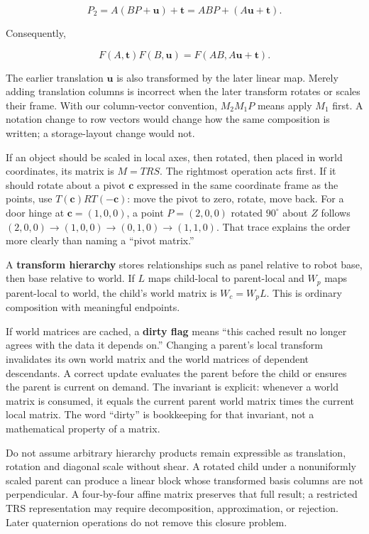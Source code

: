 \[
P_2=A(BP+\mathbf u)+\mathbf t
=ABP+(A\mathbf u+\mathbf t).
\]

Consequently,

\[
F(A,\mathbf t)F(B,\mathbf u)
=F(AB,A\mathbf u+\mathbf t).
\]

The earlier translation \(\mathbf u\) is also transformed by the later linear map. Merely adding translation columns is incorrect when the later transform rotates or scales their frame. With our column-vector convention, \(M_2M_1P\) means apply \(M_1\) first. A notation change to row vectors would change how the same composition is written; a storage-layout change would not.

If an object should be scaled in local axes, then rotated, then placed in world coordinates, its matrix is \(M=TRS\). The rightmost operation acts first. If it should rotate about a pivot \(\mathbf c\) expressed in the same coordinate frame as the points, use \(T(\mathbf c)RT(-\mathbf c)\): move the pivot to zero, rotate, move back. For a door hinge at \(\mathbf c=(1,0,0)\), a point \(P=(2,0,0)\) rotated \(90^\circ\) about \(Z\) follows \((2,0,0)\to(1,0,0)\to(0,1,0)\to(1,1,0)\). That trace explains the order more clearly than naming a ``pivot matrix.''

A \textbf{transform hierarchy} stores relationships such as panel relative to robot base, then base relative to world. If \(L\) maps child-local to parent-local and \(W_p\) maps parent-local to world, the child's world matrix is \(W_c=W_pL\). This is ordinary composition with meaningful endpoints.

If world matrices are cached, a \textbf{dirty flag} means ``this cached result no longer agrees with the data it depends on.'' Changing a parent's local transform invalidates its own world matrix and the world matrices of dependent descendants. A correct update evaluates the parent before the child or ensures the parent is current on demand. The invariant is explicit: whenever a world matrix is consumed, it equals the current parent world matrix times the current local matrix. The word ``dirty'' is bookkeeping for that invariant, not a mathematical property of a matrix.

Do not assume arbitrary hierarchy products remain expressible as translation, rotation and diagonal scale without shear. A rotated child under a nonuniformly scaled parent can produce a linear block whose transformed basis columns are not perpendicular. A four-by-four affine matrix preserves that full result; a restricted TRS representation may require decomposition, approximation, or rejection. Later quaternion operations do not remove this closure problem.


